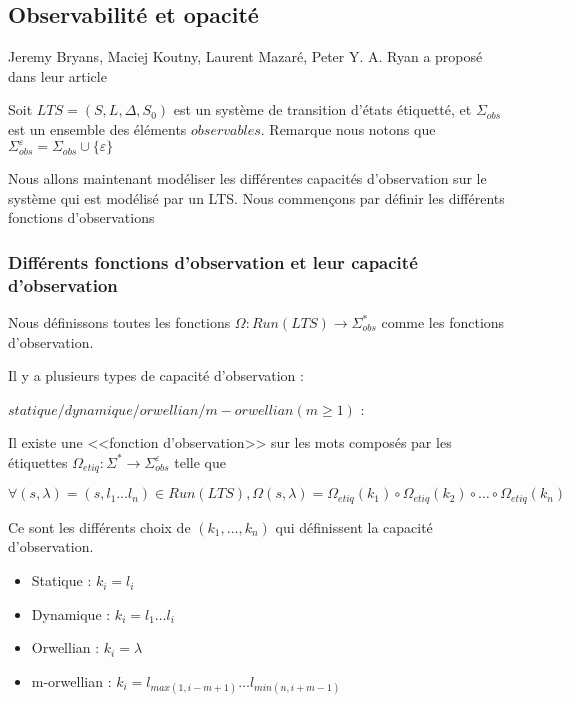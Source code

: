 \documentclass[10pt,a4paper]{article}
\begin{document}
\subsection{Observabilit\'e et opacit\'e}

Jeremy Bryans, Maciej Koutny, Laurent Mazar{\'{e}}, Peter Y. A. Ryan a propos\'e dans leur article ~\cite{BryansKMR08}

Soit $LTS=(S,L,\Delta,S_0)$ est un syst\`eme de transition d'\'etats \'etiquett\'e, et $\Sigma_{obs}$ est un ensemble des \'el\'ements $observables$. Remarque nous notons que $\Sigma_{obs}^{\varepsilon} = \Sigma_{obs} \cup \{\varepsilon\}$

Nous allons maintenant mod\'eliser les diff\'erentes capacit\'es d'observation sur le syst\`eme qui est mod\'elis\'e par un LTS. Nous commen\c cons par d\'efinir les diff\'erents fonctions d'observations

\subsubsection{Diff\'erents fonctions d'observation et leur capacit\'e d'observation}

Nous d\'efinissons toutes les fonctions $\Omega : Run(LTS) \rightarrow \Sigma_{obs}^*$ comme les fonctions   
 d'observation.
 
Il y a plusieurs types de capacit\'e d'observation : 


$statique/dynamique/orwellian/m-orwellian(m\geq 1)$ :
		
Il existe une <<fonction d'observation>> sur les mots compos\'es par les \'etiquettes $\Omega_{etiq} : \Sigma^* \rightarrow \Sigma_{obs}^{\varepsilon}$ telle que 
	
	$$\forall (s,\lambda)= (s,l_1\dots l_n) \in Run(LTS), \Omega(s,\lambda) = \Omega_{etiq}(k_1)\circ\Omega_{etiq}(k_2)\circ\dots\circ\Omega_{etiq}(k_n)$$
	
	Ce sont les diff\'erents choix de $(k_1,\dots, k_n)$ qui d\'efinissent la capacit\'e d'observation.
	



\begin{itemize}
        \item Statique : $k_i = l_i$ 
	\item Dynamique : $k_i = l_1 \dots l_i$
	\item Orwellian : $k_i = \lambda$
	\item m-orwellian : $k_i = l_{max(1,i-m+1)} \dots l_{min(n,i+m-1)}$
\end{itemize}
\end{document}
